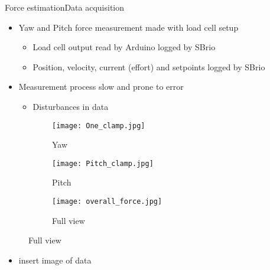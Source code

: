 \begin{frame}{Force estimation}{Data acquisition}
\begin{itemize}
\item Yaw and Pitch force measurement made with load cell setup
\begin{itemize}
\item Load cell output read by Arduino logged by SBrio
\item Position, velocity, current (effort) and setpoints logged by SBrio
\end{itemize}
\item Measurement process slow and prone to error
\begin{itemize}
\item Disturbances in data
\end{itemize}
\end{itemize}
\begin{figure}
\centering
    \begin{subfigure}[t]{0.32\textwidth}
        \centering
        \texttt{[image: One\_clamp.jpg]} 
        \caption{Yaw} \label{fig:mes1}
    \end{subfigure}
    \begin{subfigure}[t]{0.32\textwidth}
        \centering
        \texttt{[image: Pitch\_clamp.jpg]} 
        \caption{Pitch} \label{fig:mes2}
    \end{subfigure}
        \begin{subfigure}[t]{0.32\textwidth}
        \centering
        \texttt{[image: overall\_force.jpg]} 
        \caption{Full view} \label{fig:mes3}
    \end{subfigure}
\end{figure}
\end{frame}

\begin{frame}
\begin{itemize}
\item insert image of data
\end{itemize}
\end{frame}

